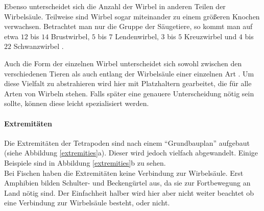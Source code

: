 Ebenso unterscheidet sich die Anzahl der Wirbel in anderen Teilen der Wirbelsäule. Teilweise sind Wirbel sogar miteinander zu einem größeren Knochen verwachsen. Betrachtet man nur die Gruppe der Säugetiere, so kommt man auf etwa $12$ bis $14$ Brustwirbel, $5$ bis $7$ Lendenwirbel, $3$ bis $5$ Kreuzwirbel und $4$ bis $22$ Schwanzwirbel \cite{AnatomieKuenstler}.

Auch die Form der einzelnen Wirbel unterscheidet sich sowohl zwischen den verschiedenen Tieren als auch entlang der Wirbelsäule einer einzelnen Art \cite[Abschnitt 9.1 und \mbox{Abbildung 9.2}]{Vergleichende_Anatomie}. 
Um diese Vielfalt zu abstrahieren wird hier mit Platzhaltern gearbeitet, die für alle Arten von Wirbeln stehen. Falls später eine genauere Unterscheidung nötig sein sollte, können diese leicht spezialisiert werden.

\paragraph{Extremitäten}
Die Extremitäten der Tetrapoden sind nach einem "`Grundbauplan"' aufgebaut (siehe Abbildung \ref{extremities}a). Dieser wird jedoch vielfach abgewandelt. Einige Beispiele sind in Abbildung \ref{extremities}b zu sehen. \cite[S.\ 487]{AllgemeineZoologie}\\
Bei Fischen haben die Extremitäten keine Verbindung zur Wirbelsäule. Erst Amphibien bilden Schulter- und Beckengürtel aus, da sie zur Fortbewegung an Land nötig sind. \cite[Abschnitt 9.2.3]{Vergleichende_Anatomie}
Der Einfachheit halber wird hier aber nicht weiter beachtet ob eine Verbindung zur Wirbelsäule besteht, oder nicht. 

